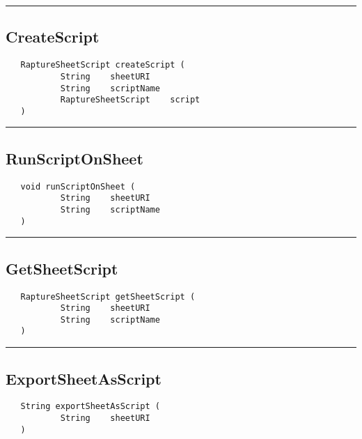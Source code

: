 \rule{15cm}{2pt}
\subsection{CreateScript}
\label{Api:CreateScript}
\begin{verbatim}
   RaptureSheetScript createScript (
           String    sheetURI
           String    scriptName
           RaptureSheetScript    script
   )
\end{verbatim}



\rule{15cm}{2pt}
\subsection{RunScriptOnSheet}
\label{Api:RunScriptOnSheet}
\begin{verbatim}
   void runScriptOnSheet (
           String    sheetURI
           String    scriptName
   )
\end{verbatim}



\rule{15cm}{2pt}
\subsection{GetSheetScript}
\label{Api:GetSheetScript}
\begin{verbatim}
   RaptureSheetScript getSheetScript (
           String    sheetURI
           String    scriptName
   )
\end{verbatim}



\rule{15cm}{2pt}
\subsection{ExportSheetAsScript}
\label{Api:ExportSheetAsScript}
\begin{verbatim}
   String exportSheetAsScript (
           String    sheetURI
   )
\end{verbatim}



